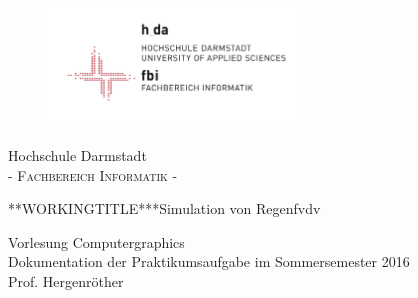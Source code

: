 \pagestyle{empty} %

\begin{figure}[h]
	\centering
	\includegraphics[width=0.6\textwidth]{Abb/logo_fbi}
\end{figure}
\begin{center}
\Large Hochschule Darmstadt \\
\normalsize \textsc{- Fachbereich Informatik -} \\
\end{center}


\begin{center}
\normalsize
\vspace{105 pt}

\Huge ***WORKINGTITLE***Simulation von Regenfvdv 
\normalsize
\vspace{65 pt}

Vorlesung Computergraphics\\
Dokumentation der Praktikumsaufgabe im Sommersemester 2016\\
Prof. Hergenröther

\vspace{75 pt}



\vspace{5 pt}
\Autoren \\
\vspace{115 pt}



\end{center}